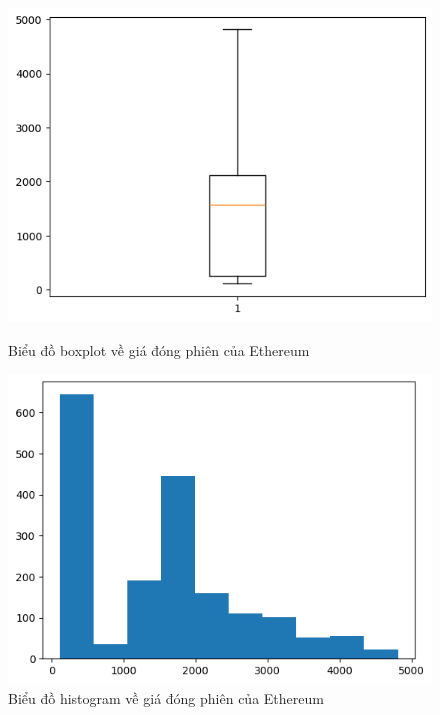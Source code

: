 \documentclass[conference]{IEEEtran}
\begin{document}
\begin{figure}[H]
    \centering
    \begin{minipage}{0.23\textwidth}
    \centering
    \includegraphics[width=1\textwidth]{bibliography/pictures/ETHboxplot.png}
    \caption{Biểu đồ boxplot về giá đóng phiên của Ethereum}
    \label{fig:1}
    \end{minipage}
    \hfill
    \begin{minipage}{0.23\textwidth}
    \centering
    \includegraphics[width=1\textwidth]{bibliography/pictures/ETHhistogram.png}
    \caption{Biểu đồ histogram về giá đóng phiên của Ethereum}
    \label{fig:2}
    \end{minipage}
\end{figure}
\end{document}
